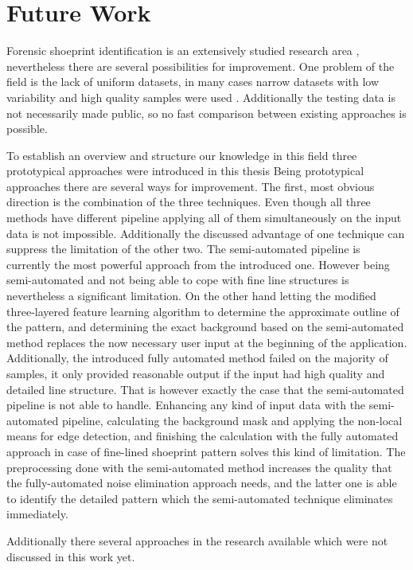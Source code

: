 \documentclass[draft,final]{vutinfth} %
\begin{document}
\chapter{Future Work}
\par
Forensic shoeprint identification is an extensively studied research area \cite{rida2019forensic}, nevertheless there are several possibilities for improvement.
One problem of the field is the lack of uniform datasets, in many cases narrow datasets with low variability and high quality samples were used  \cite{rida2019forensic}.
Additionally the testing data is not necessarily made public, so no fast comparison between existing approaches is possible.
\par
To establish an overview and structure our knowledge in this field three prototypical approaches were introduced in this thesis
Being prototypical approaches there are several ways for improvement.
The first, most obvious direction is the combination of the three techniques.
Even though all three methods have different pipeline applying all of them simultaneously on the input data is not impossible.
Additionally the discussed advantage of one technique can suppress the limitation of the other two.
The semi-automated pipeline is currently the most powerful approach from the introduced one.
However being semi-automated and not being able to cope with fine line structures is nevertheless a significant limitation.
On the other hand letting the modified three-layered feature learning algorithm to determine the approximate outline of the pattern, and determining the exact background based on the semi-automated method replaces the now necessary user input at the beginning of the application.
Additionally, the introduced fully automated method failed on the majority of samples, it only provided reasonable output if the input had high quality and detailed line structure.
That is however exactly the case that the semi-automated pipeline is not able to handle.
Enhancing any kind of input data with the semi-automated pipeline, calculating the background mask and applying the non-local means for edge detection, and finishing the calculation with the fully automated approach in case of fine-lined shoeprint pattern solves this kind of limitation.
The preprocessing done with the semi-automated method increases the quality that the fully-automated noise elimination approach needs, and the latter one is able to identify the detailed pattern which the semi-automated technique eliminates immediately.
\par
Additionally there several approaches in the research available which were not discussed in this work yet.
\end{document}
